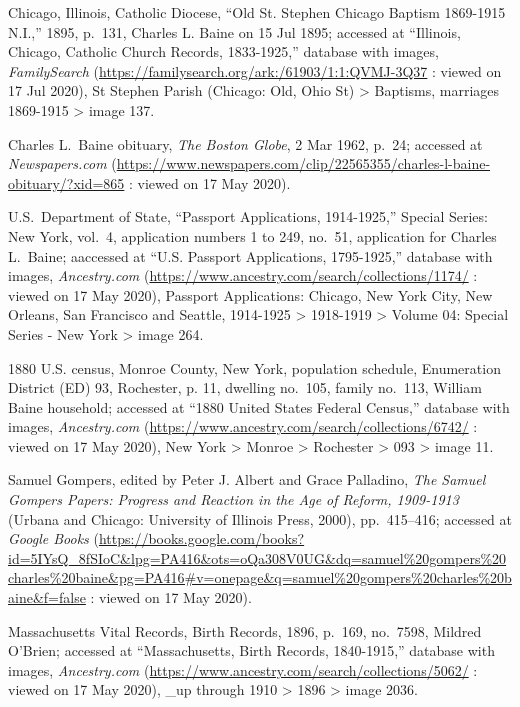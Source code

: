 \begin{thebibliography}{999}
	Chicago, Illinois, Catholic Diocese, ``Old St. Stephen Chicago Baptism 1869-1915 N.I.,'' 1895, p.\ 131, Charles L. Baine on 15 Jul 1895; accessed at ``Illinois, Chicago, Catholic Church Records, 1833-1925,'' database with images, \textit{FamilySearch} (\url{https://familysearch.org/ark:/61903/1:1:QVMJ-3Q37} : viewed on 17 Jul 2020),  St Stephen Parish (Chicago: Old, Ohio St) > Baptisms, marriages 1869-1915 > image 137.
	
	Charles L.\ Baine obituary, \textit{The Boston Globe}, 2 Mar 1962, p.\ 24; accessed at \textit{Newspapers.com} (\url{https://www.newspapers.com/clip/22565355/charles-l-baine-obituary/?xid=865} : viewed on 17 May 2020).
	
	U.S.\ Department of State, ``Passport Applications, 1914-1925,'' Special Series: New York, vol.\ 4, application numbers 1 to 249, no.\ 51, application for Charles L.\ Baine; aaccessed at ``U.S. Passport Applications, 1795-1925,'' database with images, \textit{Ancestry.com} (\url{https://www.ancestry.com/search/collections/1174/} : viewed on 17 May 2020), Passport Applications: Chicago, New York City, New Orleans, San Francisco and Seattle, 1914-1925 > 1918-1919 > Volume 04: Special Series - New York > image 264.
	
	1880 U.S. census, Monroe County, New York, population schedule, Enumeration District (ED) 93, Rochester, p. 11, dwelling no.\ 105, family no.\ 113, William Baine household; accessed at ``1880 United States Federal Census,'' database with images, \textit{Ancestry.com} (\url{https://www.ancestry.com/search/collections/6742/} : viewed on 17 May 2020), New York > Monroe > Rochester > 093 > image 11.
	
	Samuel Gompers, edited by Peter J. Albert and Grace Palladino, \textit{The Samuel Gompers Papers: Progress and Reaction in the Age of Reform, 1909-1913} (Urbana and Chicago: University of Illinois Press, 2000), pp.\ 415--416; accessed at \textit{Google Books} (\url{https://books.google.com/books?id=5IYsQ\_8fSIoC\&lpg=PA416\&ots=oQa308V0UG\&dq=samuel\%20gompers\%20charles\%20baine\&pg=PA416#v=onepage\&q=samuel\%20gompers\%20charles\%20baine\&f=false} : viewed on 17 May 2020).
	
	Massachusetts Vital Records, Birth Records, 1896, p.\ 169, no.\ 7598, Mildred O'Brien; accessed at ``Massachusetts, Birth Records, 1840-1915,'' database with images, \textit{Ancestry.com} (\url{https://www.ancestry.com/search/collections/5062/} : viewed on 17 May 2020), \_up through 1910 > 1896 > image 2036.
	

\end{thebibliography}
